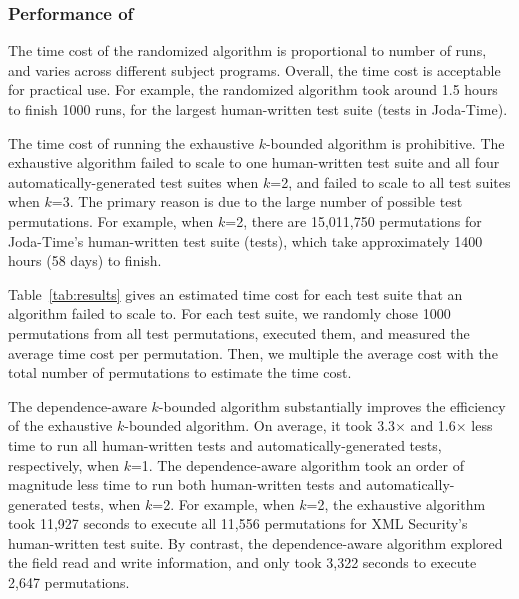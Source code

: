 
\subsubsection{Performance of \ourtool}
\label{sec:performance}

The time cost of the randomized algorithm 
is proportional to number of runs, and
varies across different subject programs.
 Overall, the time cost is acceptable for practical use.
For example, the randomized algorithm took around 1.5 hours
to finish 1000 runs,  for the largest human-written test
suite (\jodatimetests tests in Joda-Time).
 
The time cost of running the exhaustive $k$-bounded algorithm
is prohibitive. The exhaustive algorithm failed to
scale to one human-written test suite and all four automatically-generated
test suites when $k$=2, and failed to scale to all test suites
when $k$=3. The primary reason is due to the large
number of possible test permutations. 
For example, when $k$=2, there are 15,011,750 permutations
for Joda-Time's human-written test suite (\jodatimetests tests),
which take approximately 1400 hours (58 days) to finish.

Table~\ref{tab:results} gives an estimated time cost for each
test suite that an algorithm failed to scale to. For each test suite,
we randomly chose 1000 permutations from all
test permutations, executed them, and measured the average time cost
per permutation. Then, we multiple
the average cost with the total number of permutations to estimate
the time cost.

The dependence-aware $k$-bounded algorithm substantially improves
the efficiency of the exhaustive $k$-bounded algorithm. On average,
it took 3.3$\times$ and 1.6$\times$ less time to run all
human-written tests and automatically-generated tests, respectively, when $k$=1.
The dependence-aware algorithm took an order of magnitude
less time to run both human-written tests and automatically-generated tests,
when $k$=2.
For example, when $k$=2, the exhaustive algorithm took 11,927 seconds
to execute all 11,556 permutations for XML Security's human-written test suite.
By contrast, the dependence-aware algorithm
explored the field read and write information, and
only took 3,322 seconds to execute 2,647 permutations.





